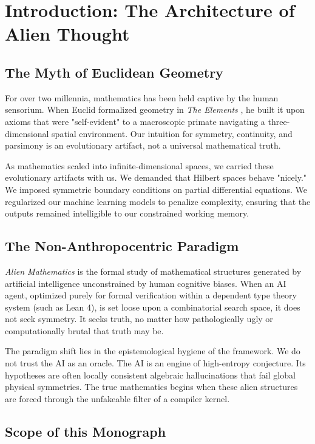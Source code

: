 \chapter{Introduction: The Architecture of Alien Thought}

\section{The Myth of Euclidean Geometry}

For over two millennia, mathematics has been held captive by the human sensorium. When Euclid formalized geometry in \textit{The Elements} \cite{euclid1956elements}, he built it upon axioms that were "self-evident" to a macroscopic primate navigating a three-dimensional spatial environment. Our intuition for symmetry, continuity, and parsimony is an evolutionary artifact, not a universal mathematical truth.

As mathematics scaled into infinite-dimensional spaces, we carried these evolutionary artifacts with us. We demanded that Hilbert spaces behave "nicely." We imposed symmetric boundary conditions on partial differential equations. We regularized our machine learning models to penalize complexity, ensuring that the outputs remained intelligible to our constrained working memory.

\section{The Non-Anthropocentric Paradigm}

\textit{Alien Mathematics} is the formal study of mathematical structures generated by artificial intelligence unconstrained by human cognitive biases. When an AI agent, optimized purely for formal verification within a dependent type theory system (such as Lean 4), is set loose upon a combinatorial search space, it does not seek symmetry. It seeks truth, no matter how pathologically ugly or computationally brutal that truth may be.

The paradigm shift lies in the epistemological hygiene of the framework. We do not trust the AI as an oracle. The AI is an engine of high-entropy conjecture. Its hypotheses are often locally consistent algebraic hallucinations that fail global physical symmetries. The true mathematics begins when these alien structures are forced through the unfakeable filter of a compiler kernel.

\section{Scope of this Monograph}


